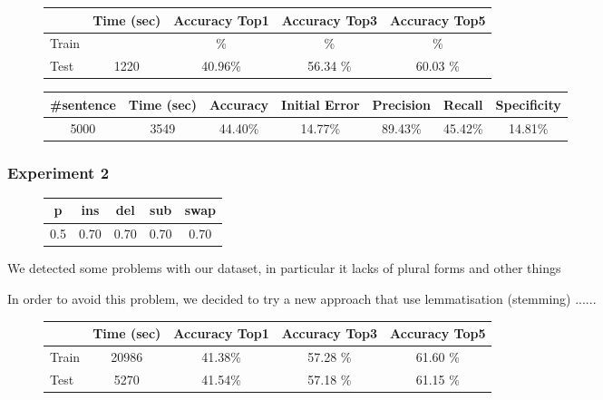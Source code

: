 \begin{figure}[H]
	\centering
	\begin{tabular}{lcccc}
		\toprule
		& Time (sec)  & Accuracy Top1 & Accuracy Top3  &  Accuracy Top5 \\
		\midrule
		Train & \num{} & \%  &  \% &  \%  \\
		Test &	\num{1220}  & \num{40,96}\%  & \num{56,34} \% & \num{60,03} \%  \\
		\bottomrule
	\end{tabular}
	\label{tab:typo-eval1}
\end{figure}


\begin{figure}[H]
	\centering
	\begin{tabular}{ccccccc}
		\toprule
		\#sentence & Time (sec)  & Accuracy & Initial Error  &  Precision & Recall & Specificity \\
		\midrule
		\num{5000}	& \num{3549}  & \num{44,40}\%  & \num{14,77}\% & \num{89,43}\% & \num{45,42}\%  & 
		\num{14,81}\%  
		\\
		\bottomrule
	\end{tabular}
	\label{tab:sentence-eval1}
\end{figure}

\subsubsection{Experiment 2}
\begin{figure}[H]
	\centering
	\begin{tabular}{ccccc}
		\toprule
		p 				 & ins 				 	& del  				&  sub 			   &   swap\\ \midrule
		\num{0.5} & \num{0,70} & \num{0,70}  & \num{0,70} & \num{0,70}\\
		\bottomrule
	\end{tabular}
	\label{tab:error_model2}
\end{figure}

We detected some problems with our dataset, in particular it lacks of plural forms and other things

In order to avoid this problem, we decided to try a new approach that use lemmatisation (stemming) ......

\begin{figure}[H]
	\centering
	\begin{tabular}{lcccc}
		\toprule
		& Time (sec)  & Accuracy Top1 & Accuracy Top3  &  Accuracy Top5 \\
		\midrule
		Train & \num{20986} & \num{41,38}\%  & \num{57,28} \% & \num{61,60} \% \\
		Test &	\num{5270}  & \num{41,54}\%  & \num{57,18} \% & \num{61,15} \%  \\
		\bottomrule
	\end{tabular}
	\label{tab:typo-eval2}
\end{figure}


